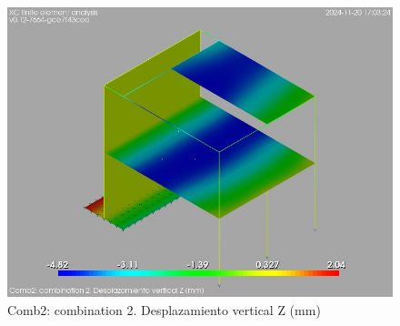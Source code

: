 \begin{figure}[ht]
\begin{center}
\includegraphics[width=\linewidth]{results/graphics/resSimplLC/LS2uZ.png}
\caption{Comb2: combination 2. Desplazamiento vertical Z (mm)}
\label{LS2uZ}
\end{center}
\end{figure}
\clearpage 
